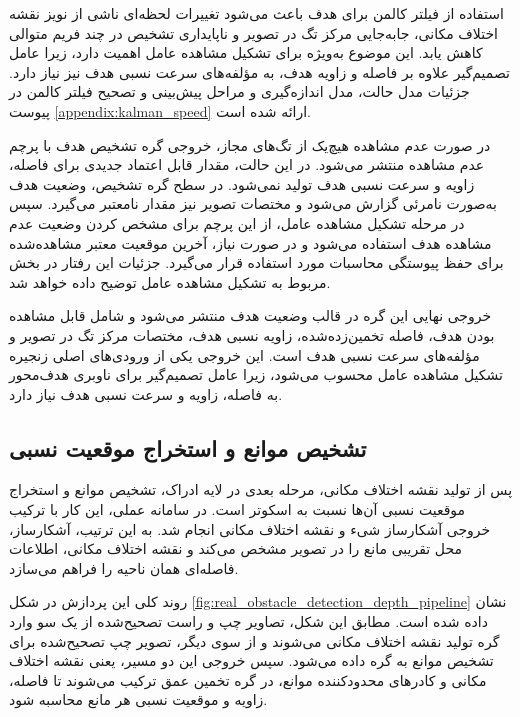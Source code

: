 استفاده از فیلتر کالمن برای هدف باعث می‌شود تغییرات لحظه‌ای ناشی از نویز نقشه اختلاف مکانی، جابه‌جایی مرکز تگ در تصویر و ناپایداری تشخیص در چند فریم متوالی کاهش یابد. این موضوع به‌ویژه برای تشکیل مشاهده عامل اهمیت دارد، زیرا عامل تصمیم‌گیر علاوه بر فاصله و زاویه هدف، به مؤلفه‌های سرعت نسبی هدف نیز نیاز دارد. جزئیات مدل حالت، مدل اندازه‌گیری و مراحل پیش‌بینی و تصحیح فیلتر کالمن در پیوست \ref{appendix:kalman_speed} ارائه شده است.

در صورت عدم مشاهده هیچ‌یک از تگ‌های مجاز، خروجی گره تشخیص هدف با پرچم عدم مشاهده منتشر می‌شود. در این حالت، مقدار قابل اعتماد جدیدی برای فاصله، زاویه و سرعت نسبی هدف تولید نمی‌شود. در سطح گره تشخیص، وضعیت هدف به‌صورت نامرئی گزارش می‌شود و مختصات تصویر نیز مقدار نامعتبر می‌گیرد. سپس در مرحله تشکیل مشاهده عامل، از این پرچم برای مشخص کردن وضعیت عدم مشاهده هدف استفاده می‌شود و در صورت نیاز، آخرین موقعیت معتبر مشاهده‌شده برای حفظ پیوستگی محاسبات مورد استفاده قرار می‌گیرد. جزئیات این رفتار در بخش مربوط به تشکیل مشاهده عامل توضیح داده خواهد شد.

خروجی نهایی این گره در قالب وضعیت هدف منتشر می‌شود و شامل قابل مشاهده بودن هدف، فاصله تخمین‌زده‌شده، زاویه نسبی هدف، مختصات مرکز تگ در تصویر و مؤلفه‌های سرعت نسبی هدف است. این خروجی یکی از ورودی‌های اصلی زنجیره تشکیل مشاهده عامل محسوب می‌شود، زیرا عامل تصمیم‌گیر برای ناوبری هدف‌محور به فاصله، زاویه و سرعت نسبی هدف نیاز دارد.


\subsection{تشخیص موانع و استخراج موقعیت نسبی}
\label{subsec:real_obstacle_detection}

پس از تولید نقشه اختلاف مکانی، مرحله بعدی در لایه ادراک، تشخیص موانع و استخراج موقعیت نسبی آن‌ها نسبت به اسکوتر است. در سامانه عملی، این کار با ترکیب خروجی آشکارساز شیء و نقشه اختلاف مکانی انجام شد. به این ترتیب، آشکارساز، محل تقریبی مانع را در تصویر مشخص می‌کند و نقشه اختلاف مکانی، اطلاعات فاصله‌ای همان ناحیه را فراهم می‌سازد.

روند کلی این پردازش در شکل \ref{fig:real_obstacle_detection_depth_pipeline} نشان داده شده است. مطابق این شکل، تصاویر چپ و راست تصحیح‌شده از یک سو وارد گره تولید نقشه اختلاف مکانی می‌شوند و از سوی دیگر، تصویر چپ تصحیح‌شده برای تشخیص موانع به گره  داده می‌شود. سپس خروجی این دو مسیر، یعنی نقشه اختلاف مکانی و کادرهای محدودکننده موانع، در گره تخمین عمق ترکیب می‌شوند تا فاصله، زاویه و موقعیت نسبی هر مانع محاسبه شود.

